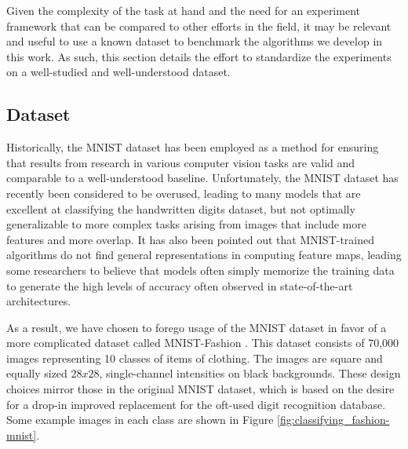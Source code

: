 Given the complexity of the task at hand and the need for an experiment framework that can be compared to other efforts in the field, it may be relevant and useful to use a known dataset to benchmark the algorithms we develop in this work.
As such, this section details the effort to standardize the experiments on a well-studied and well-understood dataset.

\subsection{Dataset}
\label{ssec:classifying_dataset}
Historically, the MNIST dataset\cite{lecun1998gradient} has been employed as a method for ensuring that results from research in various computer vision tasks are valid and comparable to a well-understood baseline.
Unfortunately, the MNIST dataset has recently been considered to be overused\cite{xiao2017fashion}, leading to many models that are excellent at classifying the handwritten digits dataset, but not optimally generalizable to more complex tasks arising from images that include more features and more overlap.
It has also been pointed out that MNIST-trained algorithms do not find general representations in computing feature maps, leading some researchers to believe that models often simply memorize the training data to generate the high levels of accuracy often observed in state-of-the-art architectures.

As a result, we have chosen to forego usage of the MNIST dataset in favor of a more complicated dataset called MNIST-Fashion \cite{xiao2017online}.
This dataset consists of 70,000 images representing 10 classes of items of clothing.
The images are square and equally sized ${28 x 28}$, single-channel intensities on black backgrounds.
These design choices mirror those in the original MNIST dataset, which is based on the desire for a drop-in improved replacement for the oft-used digit recognition database.
Some example images in each class are shown in Figure \ref{fig:classifying_fashion-mnist}.

